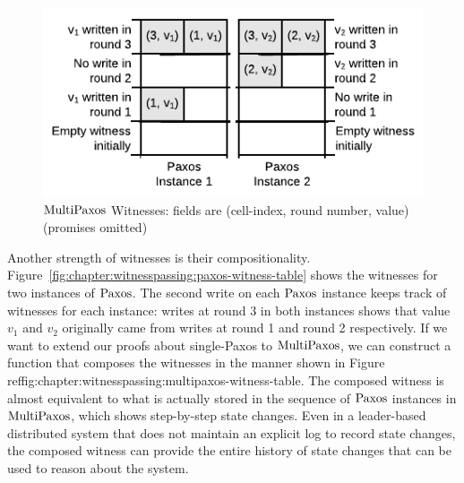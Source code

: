 \begin{figure}
\begin{center}
	\includegraphics[width=.7\textwidth, page=2]{figs/witnesspassing/witnessspmp}
\end{center}
\caption{$\mathrm{MultiPaxos}$ Witnesses: fields are (cell-index, round number, value) (promises omitted)}
\label{fig:chapter:witnesspassing:multipaxos-witness-table}
\vspace{-1em}
\end{figure}

Another strength of witnesses is their compositionality.
Figure~\ref{fig:chapter:witnesspassing:paxos-witness-table} shows the witnesses for two instances of $\mathrm{Paxos}$.
The second write on each $\mathrm{Paxos}$ instance keeps track of witnesses for each
instance: writes at round 3 in both instances shows that value $v_{1}$ and
$v_{2}$ originally came from writes at round 1 and round 2 respectively. 
If we want to extend our proofs about single-Paxos to $\mathrm{MultiPaxos}$, we can construct
a function that composes the witnesses in the manner shown in Figure~\\ref{fig:chapter:witnesspassing:multipaxos-witness-table}.
The composed witness is almost equivalent to what is actually stored in the sequence of
$\mathrm{Paxos}$ instances in $\mathrm{MultiPaxos}$, which shows step-by-step state changes.
Even in a leader-based distributed system that does not maintain an explicit log 
to record state changes, the composed witness can provide the entire history of
state changes that can be used to reason about the system. 

